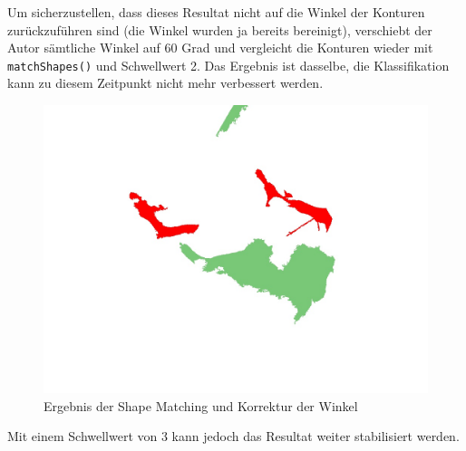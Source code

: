 Um sicherzustellen, dass dieses Resultat nicht auf die Winkel der Konturen zurückzuführen sind (die Winkel wurden ja bereits bereinigt), verschiebt der Autor sämtliche Winkel auf 60 Grad und vergleicht die Konturen wieder mit \texttt{matchShapes()} und Schwellwert 2. Das Ergebnis ist dasselbe, die Klassifikation kann zu diesem Zeitpunkt nicht mehr verbessert werden. 
\begin{figure}[H]
	\center
	\includegraphics[scale=0.43]{Grafiken/entwicklung/32BlankFilteredBySimilarity.jpg}
	\caption{Ergebnis der Shape Matching und Korrektur der Winkel} 
	\label{fig: Ergebnis der Shape Matching und Korrektur der Winkel} 
\end{figure}


Mit einem Schwellwert von 3 kann jedoch das Resultat weiter stabilisiert werden.
